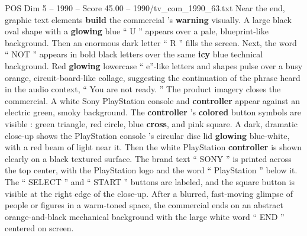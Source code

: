 \begin{textsample}{POS Dim 5 – 1990 – Score 45.00 – 1990/tv\_com\_1990\_63.txt}
Near the end, graphic text elements \textbf{build} the commercial ’s \textbf{warning} visually.
A large black oval shape with a \textbf{glowing} blue “ U ” appears over a pale, blueprint-like background.
Then an enormous dark letter “ R ” fills the screen.
Next, the word “ NOT ” appears in bold black letters over the same \textbf{icy} blue technical background.
Red \textbf{glowing} lowercase “ e”-like letters and shapes pulse over a busy orange, circuit-board-like collage, suggesting the continuation of the phrase heard in the audio context, “ You are not ready. ” The product imagery closes the commercial.
A white Sony PlayStation console and \textbf{controller} appear against an electric green, smoky background.
The \textbf{controller} ’s \textbf{colored} button symbols are visible : green triangle, red circle, blue \textbf{cross}, and pink square.
A dark, dramatic close-up shows the PlayStation console ’s circular disc lid \textbf{glowing} blue-white, with a red beam of light near it.
Then the white PlayStation \textbf{controller} is shown clearly on a black textured surface.
The brand text “ SONY ” is printed across the top center, with the PlayStation logo and the word “ PlayStation ” below it.
The “ SELECT ” and “ START ” buttons are labeled, and the square button is visible at the right edge of the close-up.
After a blurred, fast-moving glimpse of people or figures in a warm-toned space, the commercial ends on an abstract orange-and-black mechanical background with the large white word “ END ” centered on screen.

\end{textsample}
